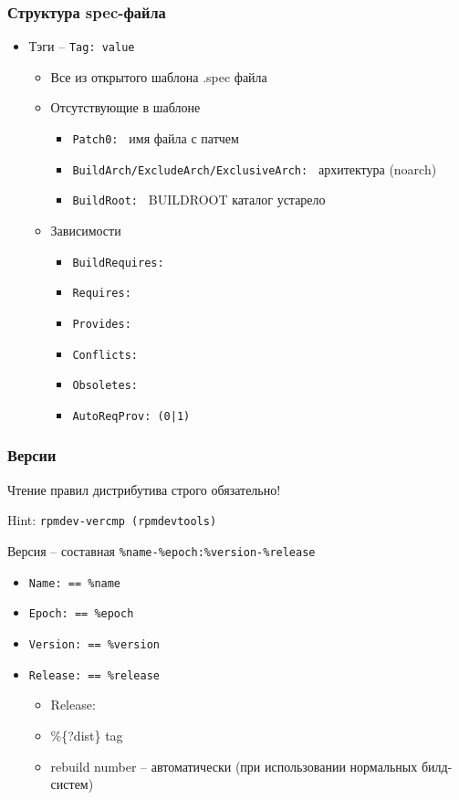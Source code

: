 \begin{frame}
	\frametitle{Структура spec-файла}	
	\begin{itemize}
		\item Тэги -- {\tt Tag: value}
		\begin{itemize}
		\item Все из открытого шаблона .spec файла
		\item Отсутствующие в шаблоне
			\begin{itemize}
			\item {\tt Patch0: } имя файла с патчем
			\item {\tt BuildArch/ExcludeArch/ExclusiveArch: } архитектура (noarch)
			\item {\tt BuildRoot: } BUILDROOT каталог устарело
			\end{itemize}
		\item Зависимости
			\begin{itemize}
			\item {\tt BuildRequires:}
			\item {\tt Requires:}
			\item {\tt Provides:}
			\item {\tt Conflicts:}
			\item {\tt Obsoletes:}
			\item {\tt AutoReqProv: (0|1)}
			\end{itemize}
		\end{itemize}
	\end{itemize}
\end{frame}

\begin{frame}
	\frametitle{Версии}

	\Large{Чтение правил дистрибутива строго обязательно!}
	
	Hint: {\tt rpmdev-vercmp (rpmdevtools)}
	\begin{block}{ Версия -- составная}
		{\tt \%name-\%epoch:\%version-\%release}
		\begin{itemize}
			\item {\tt Name: == \%name}
			\item {\tt Epoch: == \%epoch}
			\item {\tt Version: == \%version}
			\item {\tt Release: == \%release}
			\begin{itemize}
				\item Release:
				\item \%\{?dist\} tag
				\item rebuild number -- автоматически (при использовании нормальных билд-систем)
			\end{itemize}
		\end{itemize}
	\end{block}

\end{frame}

